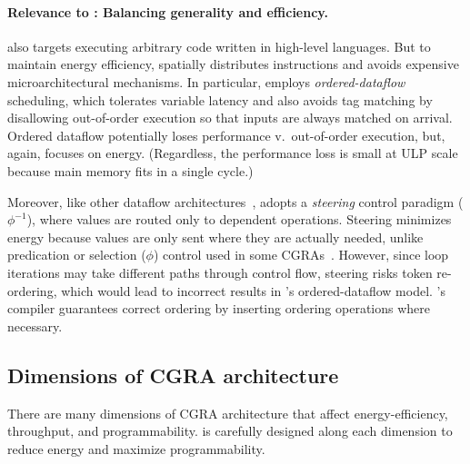 \paragraph{Relevance to \riptide: Balancing generality and efficiency.}
%
\riptide also targets executing arbitrary code written in high-level languages.
%
But to maintain energy efficiency, \riptide spatially distributes instructions
and avoids expensive microarchitectural mechanisms.
%
In particular, \riptide employs \emph{ordered-dataflow} scheduling,
which tolerates variable latency
and also avoids tag matching by disallowing
out-of-order execution so that inputs are always matched on arrival.
%
Ordered dataflow potentially loses performance v.\ out-of-order
execution, but, again, \riptide focuses on energy.
%
(Regardless, the performance loss is small at ULP scale because main memory
fits in a single cycle.)

Moreover, like other dataflow
architectures~\cite{swanson2003wavescalar,dataflow-a-complement,mishra2006tartan,beret,seed,dennis1975preliminary},
\riptide adopts a \emph{steering} control paradigm ($\phi^{-1}$), where
values are routed only to dependent operations.
%
Steering minimizes energy because values are only sent where they
are actually needed,
unlike predication or selection ($\phi$) control used
in some CGRAs~\cite{trips,snafu}.
%
However, since loop iterations may take different paths through
control flow, steering risks token re-ordering, which
would lead to incorrect results in \riptide's ordered-dataflow model.
%
\riptide's compiler guarantees correct ordering by inserting ordering
operations where necessary.


\subsection{Dimensions of CGRA architecture}
There are many dimensions of CGRA architecture that affect energy-efficiency, throughput, and programmability.
% 
\riptide is carefully designed along each dimension to reduce energy and maximize programmability.


